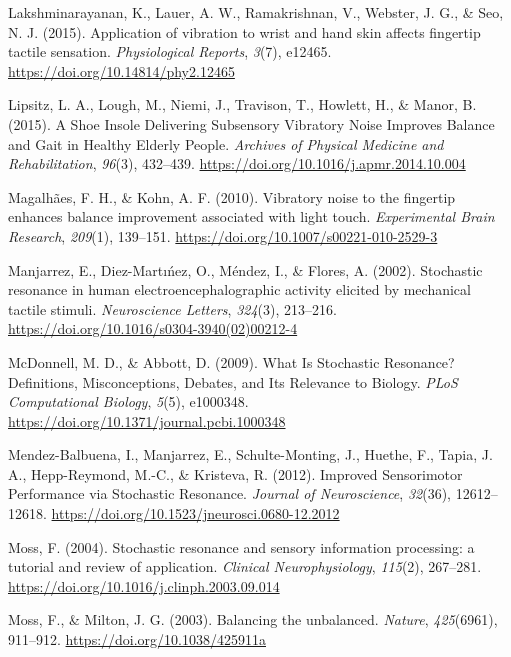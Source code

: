 \documentclass[]{cik}%
\newlength{\cslhangindent}
\newlength{\cslentryspacingunit} %
\newenvironment{CSLReferences}[2] %
 {%
  \setlength{\parindent}{0pt}
  \ifodd #1
  \let\oldpar\par
  \def\par{\hangindent=\cslhangindent\oldpar}
  \fi
  \setlength{\parskip}{#2\cslentryspacingunit}
 }%
 {}
\begin{document}
\begin{CSLReferences}{1}{0}
\leavevmode{}%
Lakshminarayanan, K., Lauer, A. W., Ramakrishnan, V., Webster, J. G., \&
Seo, N. J. (2015). Application of vibration to wrist and hand skin
affects fingertip tactile sensation. \emph{Physiological Reports},
\emph{3}(7), e12465. \url{https://doi.org/10.14814/phy2.12465}

\leavevmode{}%
Lipsitz, L. A., Lough, M., Niemi, J., Travison, T., Howlett, H., \&
Manor, B. (2015). A Shoe Insole Delivering Subsensory Vibratory Noise
Improves Balance and Gait in Healthy Elderly People. \emph{Archives of
Physical Medicine and Rehabilitation}, \emph{96}(3), 432--439.
\url{https://doi.org/10.1016/j.apmr.2014.10.004}

\leavevmode{}%
Magalhães, F. H., \& Kohn, A. F. (2010). Vibratory noise to the
fingertip enhances balance improvement associated with light touch.
\emph{Experimental Brain Research}, \emph{209}(1), 139--151.
\url{https://doi.org/10.1007/s00221-010-2529-3}

\leavevmode{}%
Manjarrez, E., Diez-Martıńez, O., Méndez, I., \& Flores, A. (2002).
Stochastic resonance in human electroencephalographic activity elicited
by mechanical tactile stimuli. \emph{Neuroscience Letters},
\emph{324}(3), 213--216.
\url{https://doi.org/10.1016/s0304-3940(02)00212-4}

\leavevmode{}%
McDonnell, M. D., \& Abbott, D. (2009). What Is Stochastic Resonance?
Definitions, Misconceptions, Debates, and Its Relevance to Biology.
\emph{PLoS Computational Biology}, \emph{5}(5), e1000348.
\url{https://doi.org/10.1371/journal.pcbi.1000348}

\leavevmode{}%
Mendez-Balbuena, I., Manjarrez, E., Schulte-Monting, J., Huethe, F.,
Tapia, J. A., Hepp-Reymond, M.-C., \& Kristeva, R. (2012). Improved
Sensorimotor Performance via Stochastic Resonance. \emph{Journal of
Neuroscience}, \emph{32}(36), 12612--12618.
\url{https://doi.org/10.1523/jneurosci.0680-12.2012}

\leavevmode{}%
Moss, F. (2004). Stochastic resonance and sensory information
processing: a tutorial and review of application. \emph{Clinical
Neurophysiology}, \emph{115}(2), 267--281.
\url{https://doi.org/10.1016/j.clinph.2003.09.014}

\leavevmode{}%
Moss, F., \& Milton, J. G. (2003). Balancing the unbalanced.
\emph{Nature}, \emph{425}(6961), 911--912.
\url{https://doi.org/10.1038/425911a}


\end{CSLReferences}
\end{document}
